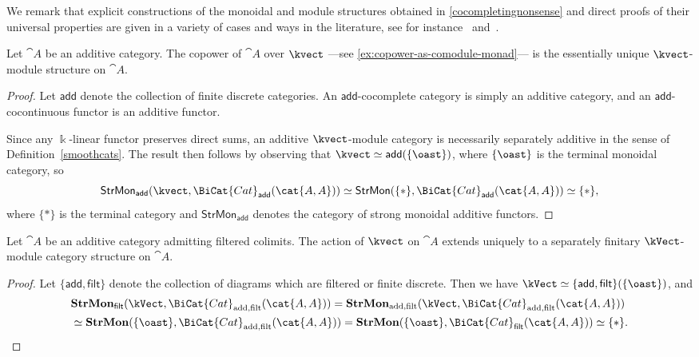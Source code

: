 We remark that explicit constructions of the monoidal and module structures obtained in \cref{cocompletingnonsense} and direct proofs of their universal properties
are given in a variety of cases and ways in the literature,
see for instance~\cite[Section~3]{mackaay19:simpl} and~\cite[Example~3.2.9]{capucci22:acteg-workin-amthem}.

\begin{proposition}
  Let \(\cat{A}\) be an additive category.
  The copower of \(\cat{A}\) over \(\kvect\)%
  —see \cref{ex:copower-as-comodule-monad}—%
  is the essentially unique \(\kvect\)\hyp{}module structure on \(\cat{A}\).
\end{proposition}

\begin{proof}
  Let \(\mathsf{add}\) denote the collection of finite discrete categories.
  An \(\mathsf{add}\)\hyp{}cocomplete category is simply an additive category, and an \(\mathsf{add}\)\hyp{}cocontinuous functor is an additive functor.

  Since any \(\Bbbk\)\hyp{}linear functor preserves direct sums, an additive \(\kvect\)\hyp{}module category is necessarily separately additive in the sense of Definition~\ref{smoothcats}.
  The result then follows by observing that \(\kvect \simeq \mathsf{add}(\{\oast\})\), where \(\{\oast\}\) is the terminal monoidal category, so
  \[
    \mathsf{StrMon}_{\mathsf{add}}(\kvect, \BiCat{Cat}_{\mathsf{add}}(\cat{A,A})) \simeq \mathsf{StrMon}(\{\ast\},\BiCat{Cat}_{\mathsf{add}}(\cat{A,A})) \simeq \{\ast\},
  \]
  where \(\{\ast\}\) is the terminal category and \(\mathsf{StrMon}_{\mathsf{add}}\) denotes the category of strong monoidal additive functors.
\end{proof}

\begin{proposition}\label{FinitaryAction}
  Let \(\cat{A}\) be an additive category admitting filtered colimits.
  The action of \(\kvect\) on \(\cat{A}\) extends uniquely
  to a separately finitary \(\kVect\)\hyp{}module category structure on \(\cat{A}\).
\end{proposition}
\begin{proof}
  Let \(\{\mathsf{add},\mathsf{filt}\}\) denote the collection of diagrams which are filtered or finite discrete.
  Then we have \(\kVect \simeq \{\mathsf{add},\mathsf{filt}\}(\{\oast\})\), and
  \begin{align*}
    &\mathbf{StrMon}_{\mathsf{filt}}(\kVect, \BiCat{Cat}_{\mathrm{add,filt}}(\cat{A,A}))
      = \mathbf{StrMon}_{\mathrm{add,filt}}(\kVect, \BiCat{Cat}_{\mathrm{add,filt}}(\cat{A,A}))\\
    &\simeq \mathbf{StrMon}(\{\oast\},\BiCat{Cat}_{\mathrm{add,filt}}(\cat{A,A}))
      = \mathbf{StrMon}(\{\oast\},\BiCat{Cat}_{\mathsf{filt}}(\cat{A,A})) \simeq \{\ast\}.\qedhere
  \end{align*}
\end{proof}

